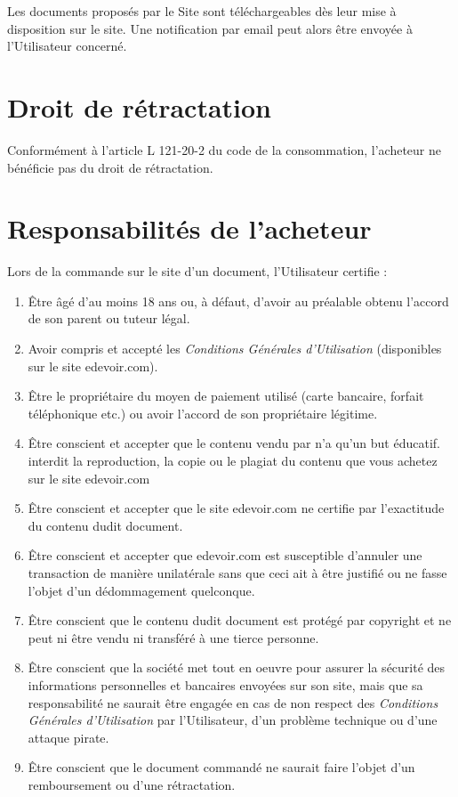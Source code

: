 Les documents proposés par le Site sont téléchargeables dès leur mise à disposition sur le site. Une notification par email peut alors être envoyée à l'Utilisateur concerné.

\section{Droit de rétractation}

Conformément à l'article L 121-20-2 du code de la consommation, l'acheteur ne bénéficie pas du droit de rétractation. 

\section{Responsabilités de l'acheteur}

Lors de la commande sur le site d'un document, l'Utilisateur certifie :
\begin{enumerate}
   \item Être âgé d'au moins 18 ans ou, à défaut, d'avoir au préalable obtenu l'accord de son parent ou tuteur légal.
   \item Avoir compris et accepté les \textit{Conditions Générales d'Utilisation} (disponibles sur le site edevoir.com).
   \item Être le propriétaire du moyen de paiement utilisé (carte bancaire, forfait téléphonique etc.) ou avoir l'accord de son propriétaire légitime.
   \item Être conscient et accepter que le contenu vendu par \eDevoir n'a qu'un but éducatif. \eDevoir interdit la reproduction, la copie ou le plagiat du contenu que vous achetez sur le site edevoir.com
   \item Être conscient et accepter que le site edevoir.com ne certifie par l'exactitude du contenu dudit document.
   \item Être conscient et accepter que edevoir.com est susceptible d'annuler une transaction de manière unilatérale sans que ceci ait à être justifié ou ne fasse l'objet d'un dédommagement quelconque.
   \item Être conscient que le contenu dudit document est protégé par copyright et ne peut ni être vendu ni transféré à une tierce personne.
   \item Être conscient que la société \eDevoir met tout en oeuvre pour assurer la sécurité des informations personnelles et bancaires envoyées sur son site, mais que sa responsabilité ne saurait être engagée en cas de non respect des \textit{Conditions Générales d'Utilisation} par l'Utilisateur, d'un problème technique ou d'une attaque pirate.
   \item Être conscient que le document commandé ne saurait faire l'objet d'un remboursement ou d'une rétractation.
\end{enumerate}